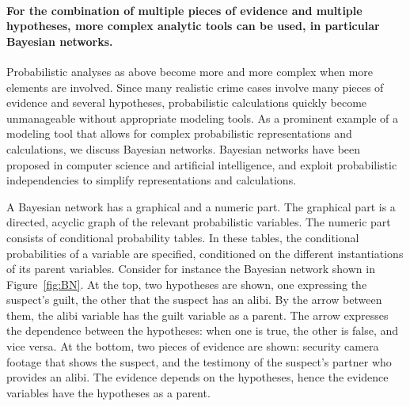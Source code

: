 \documentclass[10pt]{article}
\begin{document}




\paragraph{For the combination of multiple pieces of evidence and multiple hypotheses, more complex analytic tools can be used, in particular Bayesian networks.} Probabilistic analyses as above become more and more complex when more elements are involved. Since many realistic crime cases involve many pieces of evidence and several hypotheses, probabilistic calculations quickly become unmanageable without appropriate modeling tools. As a prominent example of a modeling tool that allows for complex probabilistic representations and calculations, we discuss Bayesian networks. Bayesian networks have been proposed in computer science and artificial intelligence, and exploit probabilistic independencies to simplify representations and calculations.

A Bayesian network has a graphical and a numeric part. The graphical part is a directed, acyclic graph of the relevant probabilistic variables. The numeric part consists of conditional probability tables. In these tables, the conditional probabilities of a variable are specified, conditioned on the different instantiations of its parent variables. Consider for instance the Bayesian network shown in Figure~\ref{fig:BN}. At the top, two hypotheses are shown, one expressing the suspect's guilt, the other that the suspect has an alibi. By the arrow between them, the alibi variable has the guilt variable as a parent. The arrow expresses the dependence between the hypotheses: when one is true, the other is false, and vice versa. At the bottom, two pieces of evidence are shown: security camera footage that shows the suspect, and the testimony of the suspect's partner who provides an alibi. The evidence depends on the hypotheses, hence the evidence variables have the hypotheses as a parent. 
\end{document}
